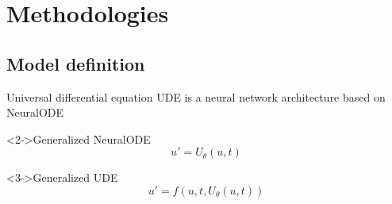 \section{Methodologies}

\subsection{Model definition}

\begin{frame}{Universal differential equation}
    \gls{UDE} \cite{rackauckasUniversalDifferentialEquations2020} is a neural network architecture based on \gls{NeuralODE} \cite{chenNeuralOrdinaryDifferential2019}
    \begin{block}<2->{Generalized \gls{NeuralODE}}
        \begin{equation*}
            u' = U_\theta(u, t)
        \end{equation*}
    \end{block}
    \begin{block}<3->{Generalized \gls{UDE}}
        \begin{equation*}
            u' = f(u, t, U_\theta(u, t))
        \end{equation*}
    \end{block}
\end{frame}

